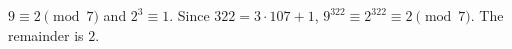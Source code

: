 $9\equiv2\pmod7$ and $2^3\equiv1$. Since $322=3\cdot107+1$, $9^{322}\equiv2^{322}\equiv2\pmod7$. The remainder is $\boxed{2}$.
